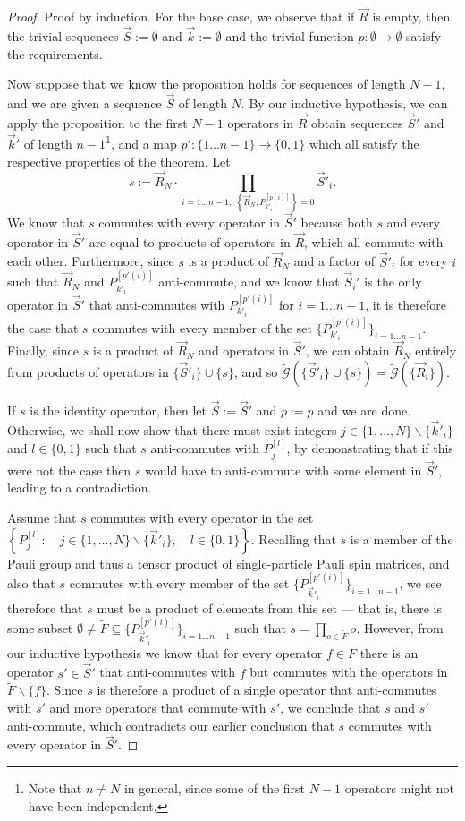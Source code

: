 \documentclass[12pt]{amsbook}
\theoremstyle{plain}
\theoremstyle{definition}
\theoremstyle{remark}
\newcommand{\lst}{\vec}
\newcommand{\set}{\tilde}
\newcommand{\genfun}{\tilde{\mathcal{G}}}
\newcommand{\paren}[1]{\left(#1\right)}
\begin{document}
\begin{proof}
Proof by induction.  For the base case, we observe that if $\lst R$ is empty, then the trivial sequences $\lst S:=\emptyset$ and $\lst k :=\emptyset$ and the trivial function $p:\emptyset\to\emptyset$ satisfy the requirements.

Now suppose that we know the proposition holds for sequences of length $N-1$, and we are given a sequence $\lst S$ of length $N$.  By our inductive hypothesis, we can apply the proposition to the first $N-1$ operators in $\lst R$ obtain sequences $\lst S'$ and $\lst k'$ of length $n-1$\footnote{Note that $n\ne N$ in general, since some of the first $N-1$ operators might not have been independent.}, and a map $p':\{1\dots n-1\}\to \{0,1\}$ which all satisfy the respective properties of the theorem.  Let $$s:=\lst R_N\cdot \prod_{i=1\dots n-1, \,\,\left\{\lst R_N,P_{k'_i}^{[p(i)]}\right\}=0} \lst S'_i.$$  We know that $s$ commutes with every operator in $\lst S'$ because both $s$ and every operator in $\lst S'$ are equal to products of operators in $\lst R$, which all commute with each other.  Furthermore, since $s$ is a product of $\lst R_N$ and a factor of $\lst S'_i$ for every $i$ such that $\lst R_N$ and $P_{k'_i}^{[p'(i)]}$ anti-commute, and we know that $\lst S_i'$ is the only operator in $\lst S'$ that anti-commutes with $P_{k'_i}^{[p'(i)]}$ for $i=1\dots n-1$, it is therefore the case that $s$ commutes with every member of the set $\{P_{k'_i}^{[p'(i)]}\}_{i=1\dots n-1}$.  Finally, since $s$ is a product of $\lst R_N$ and operators in $\lst S'$, we can obtain $\lst R_N$ entirely from products of operators in $\{\lst S'_i\} \cup \{s\}$, and so $\genfun\paren{\{\lst S'_i\} \cup \{s\}}=\genfun\paren{\{\lst R_i\}}$.

If $s$ is the identity operator, then let $\lst S:=\lst S'$ and $p:=p$ and we are done.  Otherwise, we shall now show that there must exist integers $j\in\{1,\dots,N\}\backslash\{\lst k'_i\}$ and $l\in\{0,1\}$ such that $s$ anti-commutes with $P_{j}^{[l]}$, by demonstrating that if this were not the case then $s$ would have to anti-commute with some element in $\lst S'$, leading to a contradiction.

Assume that $s$ commutes with every operator in the set $\left\{P_j^{[l]}:\quad j\in\{1,\dots,N\}\backslash\{\lst k'_i\}, \quad l\in\{0,1\}\right\}.$  Recalling that $s$ is a member of the Pauli group and thus a tensor product of single-particle Pauli spin matrices, and also that $s$ commutes with every member of the set $\{P_{\lst k'_i}^{[p'(i)]}\}_{i=1\dots n-1}$, we see therefore that $s$ must be a product of elements from this set --- that is, there is some subset $\emptyset \ne \set F \subseteq \{P_{\lst k'_i}^{[p'(i)]}\}_{i=1\dots n-1}$ such that $s=\prod_{o\in \set F} o$.  However, from our inductive hypothesis we know that for every operator $f\in\set F$ there is an operator $s'\in\lst S'$ that anti-commutes with $f$ but commutes with the operators in $\set F\backslash\{f\}$.  Since $s$ is therefore a product of a single operator that anti-commutes with $s'$ and more operators that commute with $s'$, we conclude that $s$ and $s'$ anti-commute, which contradicts our earlier conclusion that $s$ commutes with every operator in $\lst S'$.


\end{proof}
\end{document}

